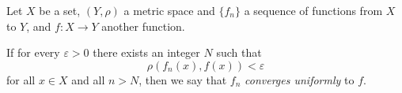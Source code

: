 \documentclass[12pt]{article}
\begin{document}
Let $X$ be a set, $(Y,\rho)$ a metric space and $\{f_n\}$ a sequence of functions from $X$ to $Y$, and $f\colon X\to Y$ another function.

If for every $\varepsilon>0$ there exists an integer $N$ such that
\[ \rho(f_n(x),f(x))<\varepsilon \]
for all $x\in X$ and all $n>N$,
then we say that $f_n$ \emph{converges uniformly} to $f$.
\end{document}
